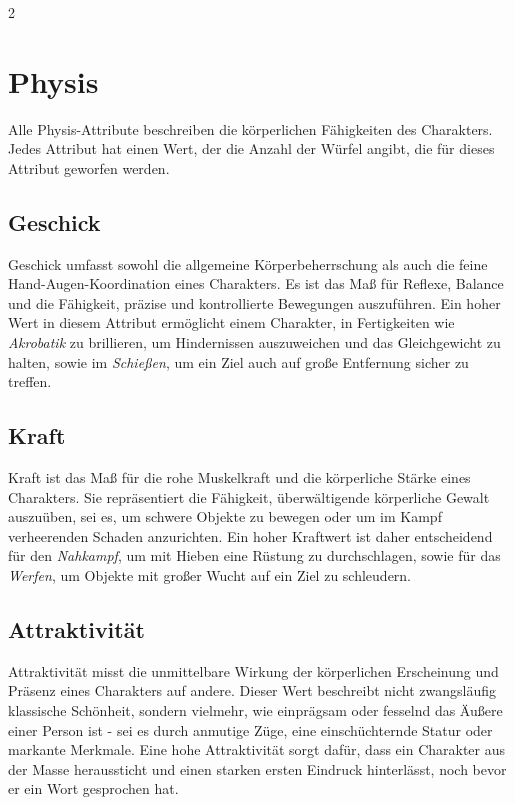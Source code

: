 \begin{multicols}{2}
\section{Physis}

Alle Physis-Attribute beschreiben die körperlichen Fähigkeiten des Charakters. Jedes Attribut hat einen Wert, der die Anzahl der Würfel angibt, die für dieses Attribut geworfen werden.

\subsection{Geschick}

Geschick umfasst sowohl die allgemeine Körperbeherrschung als auch die feine Hand-Augen-Koordination eines Charakters. Es ist das Maß für Reflexe, Balance und die Fähigkeit, präzise und kontrollierte Bewegungen auszuführen. Ein hoher Wert in diesem Attribut ermöglicht einem Charakter, in Fertigkeiten wie \textit{Akrobatik} zu brillieren, um Hindernissen auszuweichen und das Gleichgewicht zu halten, sowie im \textit{Schießen}, um ein Ziel auch auf große Entfernung sicher zu treffen.

\subsection{Kraft}

Kraft ist das Maß für die rohe Muskelkraft und die körperliche Stärke eines Charakters. Sie repräsentiert die Fähigkeit, überwältigende körperliche Gewalt auszuüben, sei es, um schwere Objekte zu bewegen oder um im Kampf verheerenden Schaden anzurichten. Ein hoher Kraftwert ist daher entscheidend für den \textit{Nahkampf}, um mit Hieben eine Rüstung zu durchschlagen, sowie für das \textit{Werfen}, um Objekte mit großer Wucht auf ein Ziel zu schleudern.

\subsection{Attraktivität}

Attraktivität misst die unmittelbare Wirkung der körperlichen Erscheinung und Präsenz eines Charakters auf andere. Dieser Wert beschreibt nicht zwangsläufig klassische Schönheit, sondern vielmehr, wie einprägsam oder fesselnd das Äußere einer Person ist - sei es durch anmutige Züge, eine einschüchternde Statur oder markante Merkmale. Eine hohe Attraktivität sorgt dafür, dass ein Charakter aus der Masse heraussticht und einen starken ersten Eindruck hinterlässt, noch bevor er ein Wort gesprochen hat.


\end{multicols}
